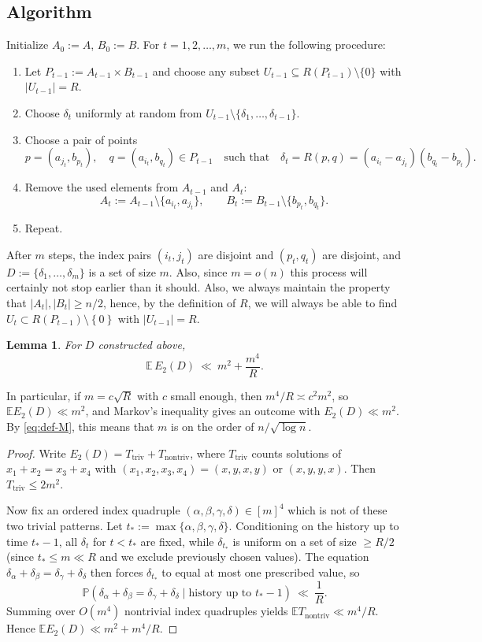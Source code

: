 \documentclass[12pt]{amsart}
\newtheorem{lemma}[theorem]{Lemma}
\theoremstyle{definition}
\theoremstyle{remark}
\newcommand{\PP}{\mathbb{P}}
\newcommand{\EE}{\mathbb{E}}
\newcommand{\abs}[1]{\left|#1\right|}
\begin{document}
\subsection*{Algorithm}

Initialize $A_0:=A$, $B_0:=B$. For $t=1,2,\dots,m$, we run the following procedure:
\begin{enumerate}
\item Let $P_{t-1}:=A_{t-1}\times B_{t-1}$ and choose any subset $U_{t-1}\subseteq R(P_{t-1})\setminus\{0\}$ with $\abs{U_{t-1}}=R$.
\item Choose $\delta_t$ uniformly at random from $U_{t-1}\setminus\{\delta_1,\dots,\delta_{t-1}\}$.
\item Choose a pair of points
\[
p=(a_{j_t},b_{p_t}),\quad q=(a_{i_t},b_{q_t})\in P_{t-1}
\quad\text{such that}\quad
\delta_t=R(p,q)=(a_{i_t}-a_{j_t})(b_{q_t}-b_{p_t}).
\]
\item Remove the used elements from $A_{t-1}$ and $A_{t}$:
\[
A_t:=A_{t-1}\setminus\{a_{i_t},a_{j_t}\},\qquad
B_t:=B_{t-1}\setminus\{b_{p_t},b_{q_t}\}.
\]
\item Repeat.
\end{enumerate}

After $m$ steps, the index pairs $(i_t,j_t)$ are disjoint and $(p_t,q_t)$ are disjoint, and
$D:=\{\delta_1,\dots,\delta_m\}$ is a set of size $m$. Also, since $m = o(n)$ this process will certainly not stop earlier than it should. Also, we always maintain the property that
$\abs{A_{t}},\abs{B_{t}}\ge n/2$, hence, by the definition of $R$, we will always be able to find $U_{t} \subset R(P_{t-1}) \setminus \left\{0\right\}$ with $|U_{t-1}| = R$. 

\begin{lemma}\label{lem:expected-energy}
For $D$ constructed above,
\[
\EE\,E_2(D)\ \ll\ m^2+\frac{m^4}{R}.
\]
\end{lemma}
In particular, if $m=c\sqrt{R}$ with $c$ small enough, then $m^4/R\asymp c^2m^2$,
so $\EE E_2(D)\ll m^2$, and Markov's inequality gives an outcome with $E_2(D)\ll m^2$. By \eqref{eq:def-M}, this means that $m$ is on the order of $n/\sqrt{\log n}$.

\begin{proof}
Write $E_2(D)=T_{\mathrm{triv}}+T_{\mathrm{nontriv}}$, where $T_{\mathrm{triv}}$ counts solutions of
$x_1+x_2=x_3+x_4$ with $(x_1,x_2,x_3,x_4)=(x,y,x,y)$ or $(x,y,y,x)$. Then $T_{\mathrm{triv}}\le 2m^2$.

Now fix an ordered index quadruple $(\alpha,\beta,\gamma,\delta)\in[m]^4$ which is not of these two
trivial patterns. Let $t_*:=\max\{\alpha,\beta,\gamma,\delta\}$. Conditioning on the history up to
time $t_*-1$, all $\delta_t$ for $t<t_*$ are fixed, while $\delta_{t_*}$ is uniform on a set of size
$\ge R/2$ (since $t_*\le m\ll R$ and we exclude previously chosen values).
The equation $\delta_\alpha+\delta_\beta=\delta_\gamma+\delta_\delta$ then forces $\delta_{t_*}$ to
equal at most one prescribed value, so
\[
\PP(\delta_\alpha+\delta_\beta=\delta_\gamma+\delta_\delta\mid\text{history up to }t_*-1)\ \ll\ \frac{1}{R}.
\]
Summing over $O(m^4)$ nontrivial index quadruples yields $\EE T_{\mathrm{nontriv}}\ll m^4/R$.
Hence $\EE E_2(D)\ll m^2+m^4/R$. 
\end{proof}
\end{document}
